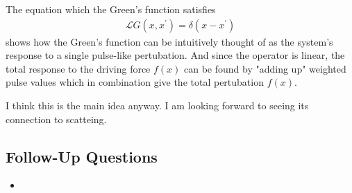 The equation which the Green's function satisfies \begin{align*}
    \mathcal{L} G(x, x^{\prime}) = \delta (x - x^{\prime})
\end{align*} 
shows how the Green's function can be intuitively thought of as the system's response to a single pulse-like pertubation. And since the operator is linear, the total response to the driving force \(f(x)\) can be found by "adding up" weighted pulse values which in combination give the total pertubation \(f(x)\). 

I think this is the main idea anyway. I am looking forward to seeing its connection to scatteing. 

\subsection*{Follow-Up Questions}
\begin{itemize}
    \item {}
\end{itemize}
